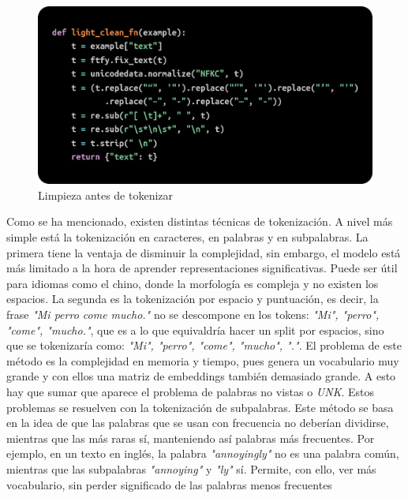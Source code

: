 \documentclass[11pt]{book}
\begin{document}
\begin{figure}[h]
    \centering
    \includegraphics[width=0.5\linewidth]{img/preclean.png}
    \caption{Limpieza antes de tokenizar}
    \label{fig:placeholder2}
\end{figure}
Como se ha mencionado, existen distintas técnicas de tokenización. A nivel más simple está la tokenización en caracteres, en palabras y en subpalabras. La primera tiene la ventaja de disminuir la complejidad, sin embargo, el modelo está más limitado a la hora de aprender representaciones significativas. Puede ser útil para idiomas como el chino, donde la morfología es compleja y no existen los espacios. La segunda es la tokenización por espacio y puntuación, es decir, la frase \textit{"Mi perro come mucho."} no se descompone en los tokens: \textit{"Mi", "perro", "come", "mucho."}, que es a lo que equivaldría hacer un split por espacios, sino que se tokenizaría como: \textit{"Mi", "perro", "come", "mucho", "."}. El problema de este método es la complejidad en memoria y tiempo, pues genera un vocabulario muy grande y con ellos una matriz de embeddings también demasiado grande. A esto hay que sumar que aparece el problema de palabras no vistas o \textit{UNK}. 
Estos problemas se resuelven con la tokenización de subpalabras. Este método se basa en la idea de que las palabras que se usan con frecuencia no deberían dividirse, mientras que las más raras sí, manteniendo así palabras más frecuentes. Por ejemplo, en un texto en inglés, la palabra \textit{"annoyingly"} no es una palabra común, mientras que las subpalabras \textit{"annoying"} y \textit{"ly"} sí. Permite, con ello, ver más vocabulario, sin perder significado de las palabras menos frecuentes \parencite{lmpo2020bpe}
\end{document}
